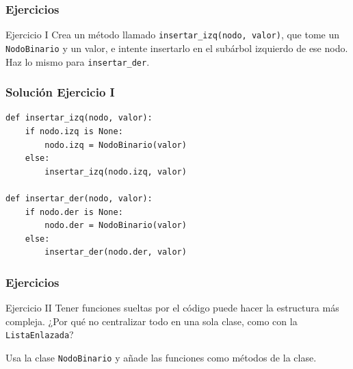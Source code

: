 \documentclass[11pt]{beamer}
\begin{document}
	\begin{frame}\frametitle{Ejercicios}
	\begin{block}{Ejercicio I}
	Crea un método llamado \lstinline|insertar_izq(nodo, valor)|, que tome un \lstinline|NodoBinario| y un valor, e intente insertarlo en el subárbol izquierdo de ese nodo. Haz lo mismo para \lstinline|insertar_der|.
	\end{block}
	\begin{center}
	\end{center}
	\end{frame}

	\begin{frame}[fragile]\frametitle{Solución Ejercicio I}
	\begin{lstlisting}
def insertar_izq(nodo, valor):
    if nodo.izq is None:
        nodo.izq = NodoBinario(valor)
    else:
        insertar_izq(nodo.izq, valor)
        
def insertar_der(nodo, valor):
    if nodo.der is None:
        nodo.der = NodoBinario(valor)
    else:
        insertar_der(nodo.der, valor)
\end{lstlisting}
	\end{frame}

	\begin{frame}\frametitle{Ejercicios}
	\begin{block}{Ejercicio II}
	Tener funciones sueltas por el código puede hacer la estructura más compleja. ¿Por qué no centralizar todo en una sola clase, como con la \lstinline|ListaEnlazada|?

	Usa la clase \lstinline|NodoBinario| y añade las funciones como métodos de la clase.
	\end{block}
	\end{frame}
\end{document}
